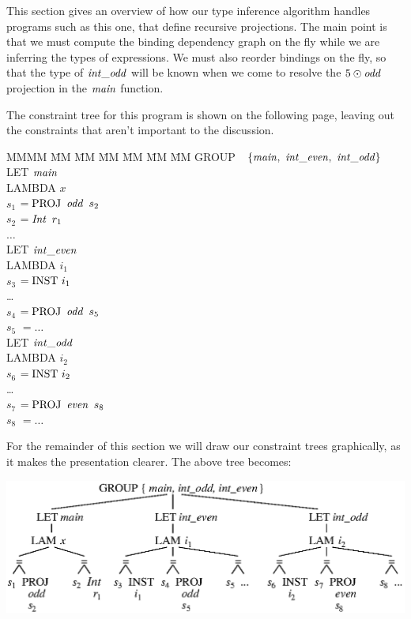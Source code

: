 This section gives an overview of how our type inference algorithm handles programs such as this one, that define recursive projections. The main point is that we must compute the binding dependency graph on the fly while we are inferring the types of expressions. We must also reorder bindings on the fly, so that the type of $\operatorname{\mathit{int\_odd}}$ will be known when we come to resolve the $5 \odot \operatorname{\mathit{odd}}$ projection in the $\operatorname{\mathit{main}}$ function.

The constraint tree for this program is shown on the following page, leaving out the constraints that aren't important to the discussion.

\clearpage{}
\begin{tabbing}
MMMM \=	MM \= MM \= MM \= MM \= MM \= MM \kill
 \>	GROUP \ $\{ \imain, \ \iintEven, \ \iintOdd \}$ \\
 \>	\> LET $\operatorname{\mathit{main}}$ \\
 \>	\>	\> LAMBDA $x$ \\
 \>	\>	\>	\> $s_1$ \> $= \textrm{PROJ} \ \operatorname{\mathit{odd}} \ s_2$ \\
 \>	\>	\>	\> $s_2$ \> $= \operatorname{\mathit{Int}} \ r_1$ \\
 \>	\>	\> 	\> $\dots$ \\
 \>	\> LET $\operatorname{\mathit{int\_even}}$ \\
 \>	\>	\> LAMBDA $i_1$ \\
 \>	\>	\>	\> $s_3$ \> $= \textrm{INST} \ i_1$ \\
 \>	\>	\>	\> \dots \\
 \>	\>	\> 	\> $s_4$ \> $= \textrm{PROJ} \ \operatorname{\mathit{odd}} \ s_5$ \\
 \>	\>	\>	\> $s_5$ \> $= \dots$ \\
 \>	\> LET $\operatorname{\mathit{int\_odd}}$ \\
 \>	\>	\> LAMBDA $i_2$ \\
 \>	\>	\>	\> $s_6$ \> $= \textrm{INST} \ i_2$ \\
 \>	\>	\>	\> \dots \\
 \>	\>	\> 	\> $s_7$ \> $= \textrm{PROJ} \ \operatorname{\mathit{even}} \ s_8$ \\
 \>	\>	\>	\> $s_8$ \> $= \dots$
\end{tabbing}

For the remainder of this section we will draw our constraint trees graphically, as it makes the presentation clearer. The above tree becomes:
\begin{center}
\includegraphics{3-Inference/fig/ordering/tree-start}
\end{center}

